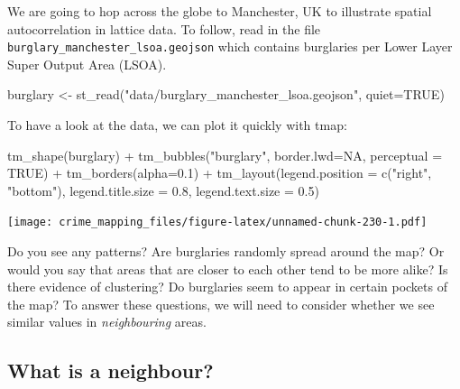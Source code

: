 \documentclass[
  krantz2]{krantz}
\makeatletter
\newenvironment{Shaded}{\begin{snugshade}}{\end{snugshade}}
\newcommand{\AttributeTok}[1]{\textcolor[rgb]{0.61,0.61,0.61}{#1}}
\newcommand{\ConstantTok}[1]{\textcolor[rgb]{0,0,0}{#1}}
\newcommand{\FloatTok}[1]{\textcolor[rgb]{0.06,0.06,0.06}{#1}}
\newcommand{\FunctionTok}[1]{\textcolor[rgb]{0,0,0}{#1}}
\newcommand{\NormalTok}[1]{#1}
\newcommand{\OtherTok}[1]{\textcolor[rgb]{0.37,0.37,0.37}{#1}}
\newcommand{\SpecialCharTok}[1]{\textcolor[rgb]{0,0,0}{#1}}
\newcommand{\StringTok}[1]{\textcolor[rgb]{0.5,0.5,0.5}{#1}}
\newenvironment{kframe}{%
\medskip{}
\setlength{\fboxsep}{.8em}
 \def\at@end@of@kframe{}%
 \ifinner\ifhmode%
  \def\at@end@of@kframe{\end{minipage}}%
  \begin{minipage}{\columnwidth}%
 \fi\fi%
 \def\FrameCommand##1{\hskip\@totalleftmargin \hskip-\fboxsep
 \colorbox{shadecolor}{##1}\hskip-\fboxsep
     \hskip-\linewidth \hskip-\@totalleftmargin \hskip\columnwidth}%
 \MakeFramed {\advance\hsize-\width
   \@totalleftmargin\z@ \linewidth\hsize
   \@setminipage}}%
 {\par\unskip\endMakeFramed%
 \at@end@of@kframe}
\renewenvironment{Shaded}{\begin{kframe}}{\end{kframe}}
\makeatother
\begin{document}
We are going to hop across the globe to Manchester, UK to illustrate spatial autocorrelation in lattice data. To follow, read in the file \texttt{burglary\_manchester\_lsoa.geojson} which contains burglaries per Lower Layer Super Output Area (LSOA).

\begin{Shaded}
\begin{Highlighting}[]
\NormalTok{burglary }\OtherTok{\textless{}{-}} \FunctionTok{st\_read}\NormalTok{(}\StringTok{"data/burglary\_manchester\_lsoa.geojson"}\NormalTok{,}
                    \AttributeTok{quiet=}\ConstantTok{TRUE}\NormalTok{)}
\end{Highlighting}
\end{Shaded}

To have a look at the data, we can plot it quickly with tmap:

\begin{Shaded}
\begin{Highlighting}[]
\FunctionTok{tm\_shape}\NormalTok{(burglary) }\SpecialCharTok{+}
  \FunctionTok{tm\_bubbles}\NormalTok{(}\StringTok{"burglary"}\NormalTok{, }\AttributeTok{border.lwd=}\ConstantTok{NA}\NormalTok{, }\AttributeTok{perceptual =} \ConstantTok{TRUE}\NormalTok{) }\SpecialCharTok{+}            
  \FunctionTok{tm\_borders}\NormalTok{(}\AttributeTok{alpha=}\FloatTok{0.1}\NormalTok{) }\SpecialCharTok{+}
  \FunctionTok{tm\_layout}\NormalTok{(}\AttributeTok{legend.position =} \FunctionTok{c}\NormalTok{(}\StringTok{"right"}\NormalTok{, }\StringTok{"bottom"}\NormalTok{),}
            \AttributeTok{legend.title.size =} \FloatTok{0.8}\NormalTok{,}
            \AttributeTok{legend.text.size =} \FloatTok{0.5}\NormalTok{)}
\end{Highlighting}
\end{Shaded}

\texttt{[image: crime\_mapping\_files/figure-latex/unnamed-chunk-230-1.pdf]}

Do you see any patterns? Are burglaries randomly spread around the map? Or would you say that areas that are closer to each other tend to be more alike? Is there evidence of clustering? Do burglaries seem to appear in certain pockets of the map? To answer these questions, we will need to consider whether we see similar values in \emph{neighbouring} areas.

\hypertarget{what-is-a-neighbour}{%
\subsection{What is a neighbour?}\label{what-is-a-neighbour}}
\end{document}

